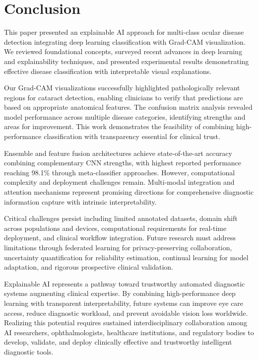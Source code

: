 \section{Conclusion}
\label{sec:conclusion}

This paper presented an explainable AI approach for multi-class ocular disease detection integrating deep learning classification with Grad-CAM visualization. We reviewed foundational concepts, surveyed recent advances in deep learning and explainability techniques, and presented experimental results demonstrating effective disease classification with interpretable visual explanations.

Our Grad-CAM visualizations successfully highlighted pathologically relevant regions for cataract detection, enabling clinicians to verify that predictions are based on appropriate anatomical features. The confusion matrix analysis revealed model performance across multiple disease categories, identifying strengths and areas for improvement. This work demonstrates the feasibility of combining high-performance classification with transparency essential for clinical trust.

Ensemble and feature fusion architectures achieve state-of-the-art accuracy combining complementary CNN strengths, with highest reported performance reaching 98.1\% through meta-classifier approaches. However, computational complexity and deployment challenges remain. Multi-modal integration and attention mechanisms represent promising directions for comprehensive diagnostic information capture with intrinsic interpretability.

Critical challenges persist including limited annotated datasets, domain shift across populations and devices, computational requirements for real-time deployment, and clinical workflow integration. Future research must address limitations through federated learning for privacy-preserving collaboration, uncertainty quantification for reliability estimation, continual learning for model adaptation, and rigorous prospective clinical validation.

Explainable AI represents a pathway toward trustworthy automated diagnostic systems augmenting clinical expertise. By combining high-performance deep learning with transparent interpretability, future systems can improve eye care access, reduce diagnostic workload, and prevent avoidable vision loss worldwide. Realizing this potential requires sustained interdisciplinary collaboration among AI researchers, ophthalmologists, healthcare institutions, and regulatory bodies to develop, validate, and deploy clinically effective and trustworthy intelligent diagnostic tools.

